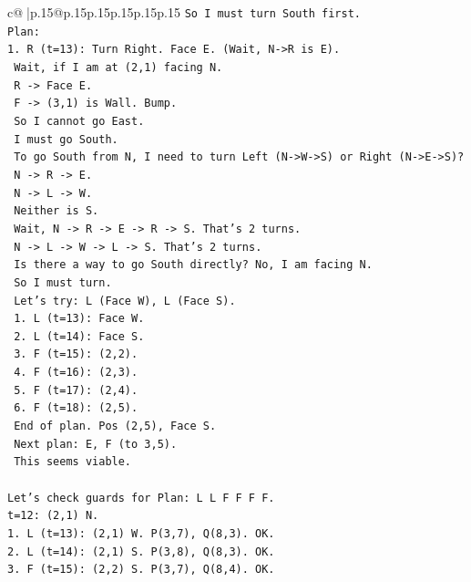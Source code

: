 \documentclass{article}
\begin{document}
{\begin{supertabular}{c@{$\;$}|p{.15\linewidth}@{}p{.15\linewidth}p{.15\linewidth}p{.15\linewidth}p{.15\linewidth}p{.15\linewidth}}
{{{\texttt{So I must turn South first.} \\
\texttt{Plan:} \\
\texttt{1. R (t=13): Turn Right. Face E. (Wait, N{-}>R is E).} \\
\texttt{   Wait, if I am at (2,1) facing N.} \\
\texttt{   R {-}> Face E.} \\
\texttt{   F {-}> (3,1) is Wall. Bump.} \\
\texttt{   So I cannot go East.} \\
\texttt{   I must go South.} \\
\texttt{   To go South from N, I need to turn Left (N{-}>W{-}>S) or Right (N{-}>E{-}>S)?} \\
\texttt{   N {-}> R {-}> E.} \\
\texttt{   N {-}> L {-}> W.} \\
\texttt{   Neither is S.} \\
\texttt{   Wait, N {-}> R {-}> E {-}> R {-}> S. That's 2 turns.} \\
\texttt{   N {-}> L {-}> W {-}> L {-}> S. That's 2 turns.} \\
\texttt{   Is there a way to go South directly? No, I am facing N.} \\
\texttt{   So I must turn.} \\
\texttt{   Let's try: L (Face W), L (Face S).} \\
\texttt{   1. L (t=13): Face W.} \\
\texttt{   2. L (t=14): Face S.} \\
\texttt{   3. F (t=15): (2,2).} \\
\texttt{   4. F (t=16): (2,3).} \\
\texttt{   5. F (t=17): (2,4).} \\
\texttt{   6. F (t=18): (2,5).} \\
\texttt{   End of plan. Pos (2,5), Face S.} \\
\texttt{   Next plan: E, F (to 3,5).} \\
\texttt{   This seems viable.} \\
\\ 
\texttt{Let's check guards for Plan: L L F F F F.} \\
\texttt{t=12: (2,1) N.} \\
\texttt{1. L (t=13): (2,1) W. P(3,7), Q(8,3). OK.} \\
\texttt{2. L (t=14): (2,1) S. P(3,8), Q(8,3). OK.} \\
\texttt{3. F (t=15): (2,2) S. P(3,7), Q(8,4). OK.} \\
}}}
\end{supertabular}}
\end{document}
